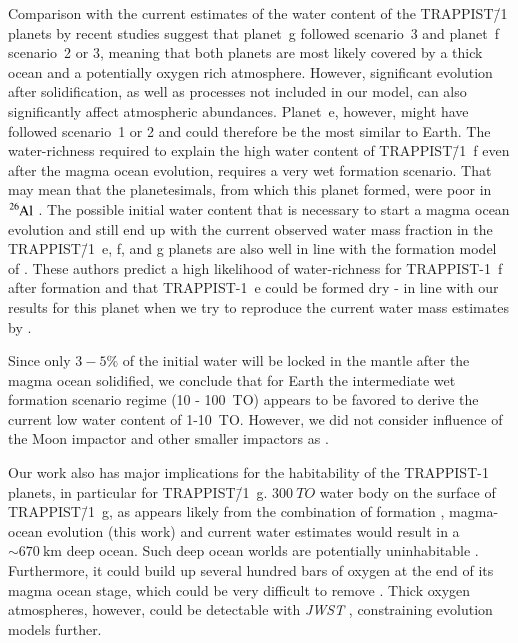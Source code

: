 \documentclass[paper=letterpaper,fontsize=12pt,oneside,twocolumn]{article}
\newcommand{\eg}{e.g. }
\begin{document}
Comparison with the current estimates of the water content of the TRAPPIST\=/1 planets by recent studies \citep{Noack2016,barr2018interior,Dorn2018,Unterborn2018b} suggest that planet~g followed scenario~3 and planet~f scenario~2 or 3, meaning that both planets are most likely covered by a thick ocean and a potentially oxygen rich atmosphere. However, significant evolution after solidification, as well as processes not included in our model, can also significantly affect atmospheric abundances. Planet~e, however, might have followed scenario~1 or 2 and could therefore be the most similar to Earth. 
The water-richness required to explain the high water content of TRAPPIST\=/1~f even after the magma ocean evolution, requires a very wet formation scenario. 
That may mean that the planetesimals, from which this planet formed, were poor in $\ce{^{26}Al}$ \citep{Lichtenberg2019}. The possible initial water content that is necessary to start a magma ocean evolution and still end up with the current observed water mass fraction in the TRAPPIST\=/1~e, f, and g planets are also well in line with the formation model of \citet{Miguel2020}. These authors predict a high likelihood of water-richness for TRAPPIST-1~f after formation and that TRAPPIST-1~e could be formed dry - in line with our results for this planet when we try to reproduce the current water mass estimates by \citet{Dorn2018}.

Since only $3-5\%$ of the initial water will be locked in the mantle after the magma ocean solidified, we conclude that for Earth the intermediate wet formation scenario regime (10 - \SI{100}{TO}) appears to be favored to derive the current low water content of 1-\SI{10}{TO}. However, we did not consider influence of the Moon impactor and other smaller impactors as \citet{zahnle2019}. 

Our work also has major implications for the habitability of the TRAPPIST-1 planets, in particular for TRAPPIST\=/1~g. $\SI{300}{TO}$ water body on the surface of TRAPPIST\=/1~g, as appears likely from the combination of formation \citep{Miguel2020}, magma-ocean evolution (this work) and current water estimates \citep{Dorn2018,Unterborn2018} would result in a $\sim \SI{670}{\kilo\metre}$ deep ocean. Such deep ocean worlds are potentially uninhabitable \citep[\eg][]{Noack2016}. Furthermore, it could build up several hundred bars of oxygen at the end of its magma ocean stage, which could be very difficult to remove \citep{lingam2020}. Thick oxygen atmospheres, however, could be detectable with \textit{JWST} \citep{Lincowski2018}, constraining evolution models further.
\end{document}
